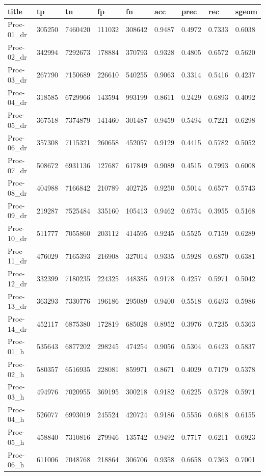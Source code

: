 \documentclass[12pt]{article}
\begin{document}
	\begin{landscape}
		\begin{tabular}{| l | l | l | l | l | l | l | l | l |}
			\rowcolor{gray!50}
			\hline
			title & tp & tn & fp & fn & acc & prec & rec & sgeom \\ \hline
			Proc-01\_dr & 305250 & 7460420 & 111032 & 308642 & 0.9487 & 0.4972 & 0.7333 & 0.6038 \\ \hline
			Proc-02\_dr & 342994 & 7292673 & 178884 & 370793 & 0.9328 & 0.4805 & 0.6572 & 0.5620 \\ \hline
			Proc-03\_dr & 267790 & 7150689 & 226610 & 540255 & 0.9063 & 0.3314 & 0.5416 & 0.4237 \\ \hline
			Proc-04\_dr & 318585 & 6729966 & 143594 & 993199 & 0.8611 & 0.2429 & 0.6893 & 0.4092 \\ \hline
			Proc-05\_dr & 367518 & 7374879 & 141460 & 301487 & 0.9459 & 0.5494 & 0.7221 & 0.6298 \\ \hline
			Proc-06\_dr & 357308 & 7115321 & 260658 & 452057 & 0.9129 & 0.4415 & 0.5782 & 0.5052 \\ \hline
			Proc-07\_dr & 508672 & 6931136 & 127687 & 617849 & 0.9089 & 0.4515 & 0.7993 & 0.6008 \\ \hline
			Proc-08\_dr & 404988 & 7166842 & 210789 & 402725 & 0.9250 & 0.5014 & 0.6577 & 0.5743 \\ \hline
			Proc-09\_dr & 219287 & 7525484 & 335160 & 105413 & 0.9462 & 0.6754 & 0.3955 & 0.5168 \\ \hline
			Proc-10\_dr & 511777 & 7055860 & 203112 & 414595 & 0.9245 & 0.5525 & 0.7159 & 0.6289 \\ \hline
			Proc-11\_dr & 476029 & 7165393 & 216908 & 327014 & 0.9335 & 0.5928 & 0.6870 & 0.6381 \\ \hline
			Proc-12\_dr & 332399 & 7180235 & 224325 & 448385 & 0.9178 & 0.4257 & 0.5971 & 0.5042 \\ \hline
			Proc-13\_dr & 363293 & 7330776 & 196186 & 295089 & 0.9400 & 0.5518 & 0.6493 & 0.5986 \\ \hline
			Proc-14\_dr & 452117 & 6875380 & 172819 & 685028 & 0.8952 & 0.3976 & 0.7235 & 0.5363 \\ \hline
			Proc-01\_h & 535643 & 6877202 & 298245 & 474254 & 0.9056 & 0.5304 & 0.6423 & 0.5837 \\ \hline
			Proc-02\_h & 580357 & 6516935 & 228081 & 859971 & 0.8671 & 0.4029 & 0.7179 & 0.5378 \\ \hline
			Proc-03\_h & 494976 & 7020955 & 369195 & 300218 & 0.9182 & 0.6225 & 0.5728 & 0.5971 \\ \hline
			Proc-04\_h & 526077 & 6993019 & 245524 & 420724 & 0.9186 & 0.5556 & 0.6818 & 0.6155 \\ \hline
			Proc-05\_h & 458840 & 7310816 & 279946 & 135742 & 0.9492 & 0.7717 & 0.6211 & 0.6923 \\ \hline
			Proc-06\_h & 611006 & 7048768 & 218864 & 306706 & 0.9358 & 0.6658 & 0.7363 & 0.7001 \\ \hline
			

\end{tabular}
\end{landscape}
\end{document}
